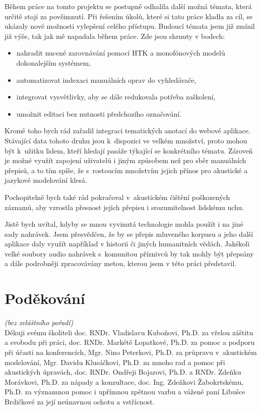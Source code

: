 Během práce na tomto projektu se postupně odhalila další možná témata, která určitě stojí za povšimnutí.
Při řešením úkolů, které si tato práce kladla za cíl, se ukázaly nové možnosti
vylepšení celého přístupu. Budoucí témata jsem již zmínil již výše, tak jak mě
napadala během práce. Zde jsou shrnuty v bodech:

\begin{itemize}
\item{nahradit nucené zarovnávání pomocí HTK a monofónových modelů
dokonalejším systémem,}
\item{automatizovat indexaci manuálních oprav do vyhledávače,}
\item{integrovat vysvětlivky, aby se dále redukovala potřeba zaškolení,}
\item{umožnit editaci bez nutnosti předchozího označování.}
\end{itemize}

Kromě toho bych rád zařadil integraci tematických anotací do webové aplikace.
Stávající data tohoto druhu jsou k~dispozici ve velkém množství, proto mohou být
k~užitku lidem, kteří hledají pasáže týkající se konkrétního tématu. Zároveň je
možné využít zapojení uživatelů i jiným způsobem než pro sběr manuálních
přepisů, a to tím spíše, že s~rostoucím množstvím jejich přínos pro akustické a
jazykové modelování klesá.


Pochopitelně bych také rád pokračoval v~akustickém čištění poškozených záznamů,
aby vzrostla přesnost jejich přepisu i srozumitelnost lidskému uchu.

Jistě bych uvítal, kdyby se mnou vyvinutá technologie mohla použít i na jiné
sady nahrávek. Jsem přesvědčen, že by se přepis mluveného korpusu a jeho další
aplikace daly využít například v historii či jiných humanitních vědách. Jakékoli
velké soubory audio nahrávek s~komunitou příznivců by tak mohly být přepsány a
dále podrobněji zpracovávány metou, kterou jsem v této práci představil.


\section{Poděkování}

{\em (bez zvláštního pořadí)}\\

Děkuji
svému školiteli doc. RNDr. Vladislavu Kuboňovi, Ph.D. za vřelou záštitu a svobodu při práci,
doc. RNDr. Markétě Lopatkové, Ph.D. za pomoc a podporu při účasti na konferencích,
Mgr. Nino Peterkovi, Ph.D. za průpravu v~akustickém modelování, 
Mgr. Davidu Klusáčkovi, Ph.D. za mnoho rad a pomoc při akustických úpravách,
doc. RNDr. Ondřeji Bojarovi, Ph.D.
a RNDr. Zdeňku Morávkovi, Ph.D. za nápady a konzultace,
doc. Ing. Zdeňkovi Žabokrtskému, Ph.D. za významnou pomoc i upřímnou zpětnou vazbu
a vážené paní Libušce Brdičkové za její neúnavnou ochotu a vstřícnost.

